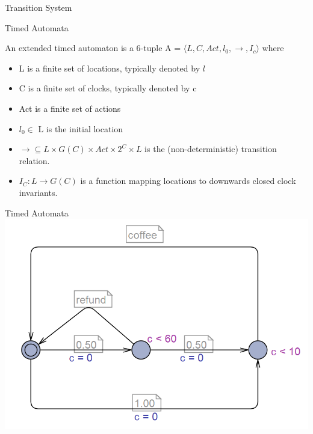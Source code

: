 \begin{frame}{Transition System}
\begin{figure}
\end{figure}
\end{frame}


\begin{frame}{Timed Automata}
\begin{mydef}
\label{def:TA}
An extended timed automaton is a 6-tuple A = $\langle L, C, Act, l_0, \rightarrow, I_c\rangle$ where
	\begin{itemize}
		\item L is a finite set of locations, typically denoted by $l$
		\item C is a finite set of clocks, typically denoted by c
		\item Act is a finite set of actions
		\item $l_0 \in$ L is the initial location
		\item $\rightarrow \subseteq L \times G(C) \times Act \times 2^C \times L$ is the (non-deterministic) transition relation.
		\item $I_C : L \rightarrow G(C)$ is a function mapping locations to downwards closed clock invariants.
	\end{itemize}
\end{mydef}
\end{frame}

\begin{frame}{Timed Automata}
\includegraphics[width=\textwidth]{img/TA}
\end{frame}

